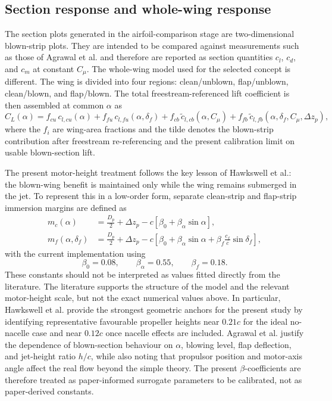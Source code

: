 \documentclass[conf]{new-aiaa}
\begin{document}
\subsection{Section response and whole-wing response}

The section plots generated in the airfoil-comparison stage are two-dimensional blown-strip plots. They are intended to be compared against measurements such as those of Agrawal et al.\cite{Agrawal2019} and therefore are reported as section quantities \(c_l\), \(c_d\), and \(c_m\) at constant \(C_\mu\). The whole-wing model used for the selected concept is different. The wing is divided into four regions: clean/unblown, flap/unblown, clean/blown, and flap/blown. The total freestream-referenced lift coefficient is then assembled at common \(\alpha\) as
\begin{equation}
C_L(\alpha)
=
f_{cu}\, c_{l,cu}(\alpha)
+
f_{fu}\, c_{l,fu}(\alpha,\delta_f)
+
f_{cb}\, \tilde{c}_{l,cb}(\alpha,C_\mu)
+
f_{fb}\, \tilde{c}_{l,fb}(\alpha,\delta_f,C_\mu,\Delta z_p),
\end{equation}
where the \(f_i\) are wing-area fractions and the tilde denotes the blown-strip contribution after freestream re-referencing and the present calibration limit on usable blown-section lift.

The present motor-height treatment follows the key lesson of Hawkswell et al.: the blown-wing benefit is maintained only while the wing remains submerged in the jet.\cite{Hawkswell2022} To represent this in a low-order form, separate clean-strip and flap-strip immersion margins are defined as
\begin{align}
m_c(\alpha)
&=
\frac{D_p}{2}
+
\Delta z_p
-
c\left[
\beta_0
+
\beta_\alpha \sin\alpha
\right], \\
m_f(\alpha,\delta_f)
&=
\frac{D_p}{2}
+
\Delta z_p
-
c\left[
\beta_0
+
\beta_\alpha \sin\alpha
+
\beta_f \frac{c_f}{c}\sin\delta_f
\right],
\end{align}
with the current implementation using
\begin{equation}
\beta_0 = 0.08,\qquad
\beta_\alpha = 0.55,\qquad
\beta_f = 0.18.
\end{equation}
These constants should not be interpreted as values fitted directly from the literature. The literature supports the structure of the model and the relevant motor-height scale, but not the exact numerical values above. In particular, Hawkswell et al. provide the strongest geometric anchors for the present study by identifying representative favourable propeller heights near \(0.21c\) for the ideal no-nacelle case and near \(0.12c\) once nacelle effects are included.\cite{Hawkswell2022} Agrawal et al. justify the dependence of blown-section behaviour on \(\alpha\), blowing level, flap deflection, and jet-height ratio \(h/c\), while also noting that propulsor position and motor-axis angle affect the real flow beyond the simple theory.\cite{Agrawal2019} The present \(\beta\)-coefficients are therefore treated as paper-informed surrogate parameters to be calibrated, not as paper-derived constants.
\end{document}
